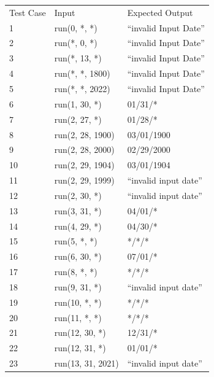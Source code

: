 \documentclass[a4paper]{article}
\begin{document}
\begin{table}[h]
	\begin{tabular}{lll}
		Test Case & Input & Expected Output\\
		1 & run(0, *, *) & ``invalid Input Date''\\
		2 & run(*, 0, *) & ``invalid Input Date''\\
		3 & run(*, 13, *) & ``invalid Input Date''\\
		4 & run(*, *, 1800) & ``invalid Input Date''\\		
		5 & run(*, *, 2022) & ``invalid Input Date''\\
		6 & run(1, 30, *) & 01/31/*\\
		7 & run(2, 27, *) & 01/28/*\\
		8 & run(2, 28, 1900) & 03/01/1900\\
		9 & run(2, 28, 2000) & 02/29/2000\\
		10 & run(2, 29, 1904) & 03/01/1904\\
		11 & run(2, 29, 1999) & ``invalid input date''\\
		12 & run(2, 30, *) & ``invalid input date''\\
		13 & run(3, 31, *) & 04/01/*\\
		14 & run(4, 29, *) & 04/30/*\\
		15 & run(5, *, *) & */*/*\\
		16 & run(6, 30, *) & 07/01/*\\
		17 & run(8, *, *) & */*/*\\
		18 & run(9, 31, *) & ``invalid input date''\\
		19 & run(10, *, *) & */*/*\\
		20 & run(11, *, *) & */*/*\\
		21 & run(12, 30, *) & 12/31/*\\
		22 & run(12, 31, *) & 01/01/*\\
		23 & run(13, 31, 2021) & ``invalid input date''\\
	\end{tabular}
\end{table}
\end{document}
